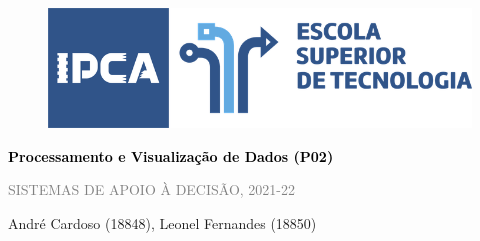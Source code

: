 \documentclass[12pt, a4paper, openright]{report}
\begin{document}
    \begin{figure}[t]
        \centering
        \includegraphics[scale=0.4]{images/est-banner.png}
    \end{figure}
    \begin{center}
        \textcolor{black}{\fontsize{22pt}{26pt}\selectfont \textbf{Processamento e Visualização de Dados (P02)}}
        
        \textcolor{gray}{\fontsize{11pt}{13pt} \selectfont SISTEMAS DE APOIO À DECISÃO, 2021-22}
        
        \bigskip
        \small André Cardoso (18848), Leonel Fernandes (18850)
    \end{center}
    
    
    
    
    
    
\end{document}
